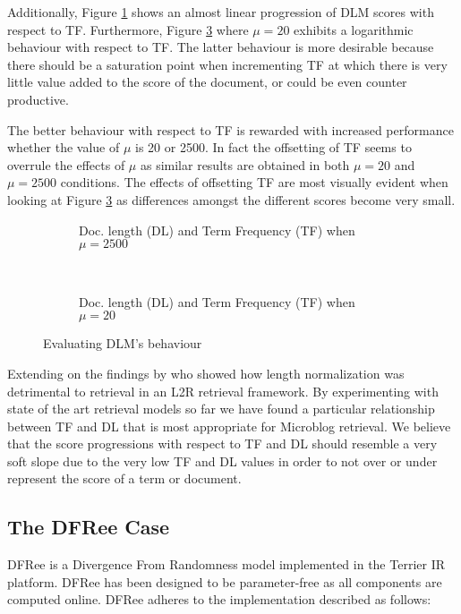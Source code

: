 Additionally, Figure \ref{dlmfigureTFDL2500} shows an almost linear progression of DLM scores with respect to TF. Furthermore, Figure \ref{dlmfigureTFDL20} where $\mu=20$ exhibits a logarithmic behaviour with respect to TF. The latter behaviour is more desirable because there should be a saturation point when incrementing TF at which there is very little value added to the score of the document, or could be even counter productive.

The better behaviour with respect to TF is rewarded with increased performance whether the value of $\mu$ is 20 or 2500. In fact the offsetting of TF seems to overrule the effects of $\mu$ as similar results are obtained in both $\mu=20$ and $\mu=2500$ conditions. The effects of offsetting TF are most visually evident when looking at Figure \ref{dlmfigureTFDL20} as differences amongst the different scores become very small. 


\begin{figure}
      	\begin{subfigure}[b]{0.5\textwidth}
          \centering
          \caption{Doc. length (DL) and Term Frequency (TF) when $\mu = 2500$}
          
          \label{dlmfigureTFDL2500}          
        \end{subfigure} 
        ~
 		\begin{subfigure}[b]{0.5\textwidth}
          \centering
          \caption{Doc. length (DL) and Term Frequency (TF) when $\mu = 20$}
          
          \label{dlmfigureTFDL20}          
        \end{subfigure} 
        \caption{Evaluating DLM's behaviour}
\end{figure}

Extending on the findings by \cite{naveed2011searching} who showed how length normalization was detrimental to retrieval in an L2R retrieval framework. By experimenting with state of the art retrieval models so far we have found a particular relationship between TF and DL that is most appropriate for Microblog retrieval. We believe that the score progressions with respect to TF and DL should resemble a very soft slope due to the very low TF and DL values in order to not over or under represent the score of a term or document.

\subsection{The DFRee Case}
DFRee is a Divergence From Randomness model implemented in the Terrier IR platform. DFRee has been designed to be parameter-free as all components are computed online. DFRee adheres to the implementation described as follows:

